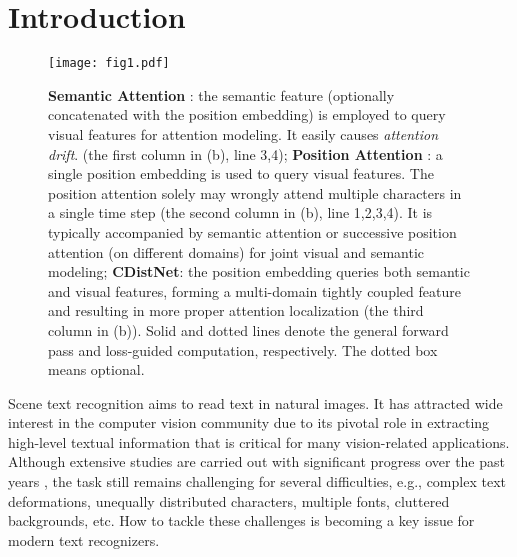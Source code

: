 \section{Introduction}

\begin{figure*}[t]
\centering
\texttt{[image: fig1.pdf]} 
\caption{\textbf{Semantic Attention} \citep{wang2019simple_transformer,sheng2019nrtr,shi2018aster,li2019sar}: the semantic feature (optionally concatenated with the position embedding) is employed to query visual features for attention modeling. It easily causes \emph{attention drift}. (the first column in (b), line 3,4); \textbf{Position Attention} \citep{SRNyu2020towards,ABInet21CVPR,wang2021FTO,yue2020robustscanner}: a single position embedding is used to query visual features. The position attention solely may wrongly attend multiple characters in a single time step (the second column in (b), line 1,2,3,4). It is typically accompanied by semantic attention or successive position attention (on different domains) for joint visual and semantic modeling; \textbf{CDistNet}: the position embedding queries both semantic and visual features, forming a multi-domain tightly coupled feature and resulting in more proper attention localization (the third column in (b)). Solid and dotted lines denote the general forward pass and loss-guided computation, respectively. The dotted box means optional.}
\label{fig1:motivation}
\end{figure*}

Scene text recognition aims to read text in natural images. It has attracted wide interest in the computer vision community due to its pivotal role in extracting high-level textual information that is critical for many vision-related applications. Although extensive studies are carried out with significant progress over the past years \citep{ShiBY17crnn,ABInet21CVPR,Baekwhats_wrong_19ICCV,lee2016attention_origin,Du2022SVTR,zheng2023mrn}, the task still remains challenging for several difficulties, e.g., complex text deformations, unequally distributed characters, multiple fonts, cluttered backgrounds, etc. How to tackle these challenges is becoming a key issue for modern text recognizers. 

